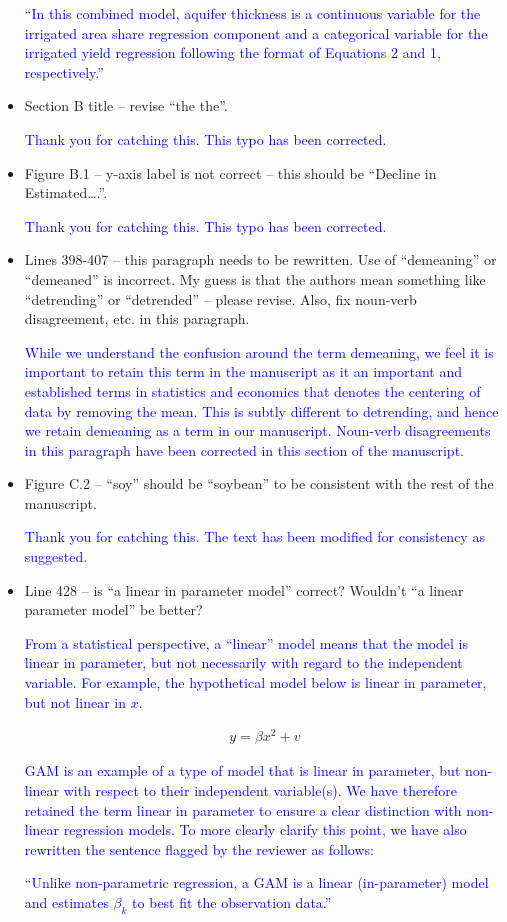 \documentclass[
]{article}
\begin{document}
\begin{itemize}
\textcolor{blue}{``In this combined model, aquifer thickness is a continuous variable for the irrigated area share regression component and a categorical variable for the irrigated yield regression following the format of Equations 2 and 1, respectively.''}

\item Section B title – revise ``the the''.

\textcolor{blue}{Thank you for catching this. This typo has been corrected.}

\item Figure B.1 – y-axis label is not correct – this should be ``Decline in Estimated….''.

\textcolor{blue}{Thank you for catching this. This typo has been corrected.}

\item Lines 398-407 – this paragraph needs to be rewritten. Use of ``demeaning'' or ``demeaned'' is incorrect. My guess is that the authors mean something like ``detrending'' or ``detrended'' – please revise. Also, fix noun-verb disagreement, etc. in this paragraph.

\textcolor{blue}{While we understand the confusion around the term demeaning, we feel it is important to retain this term in the manuscript as it an important and established terms in statistics and economics that denotes the centering of data by removing the mean. This is subtly different to detrending, and hence we retain demeaning as a term in our manuscript. Noun-verb disagreements in this paragraph have been corrected in this section of the manuscript.}

\item Figure C.2 – ``soy'' should be ``soybean'' to be consistent with the rest of the manuscript.

\textcolor{blue}{Thank you for catching this. The text has been modified for consistency as suggested.}

\item Line 428 – is ``a linear in parameter model'' correct? Wouldn't ``a linear parameter model'' be better?

\textcolor{blue}{From a statistical perspective, a ``linear'' model means that the model is linear in parameter, but not necessarily with regard to the independent variable. For example, the hypothetical model below is linear in parameter, but not linear in $x$.} 

\begin{align}
  y = \beta x^2 + v
\end{align}  

\textcolor{blue}{GAM is an example of a type of model that is linear in parameter, but non-linear with respect to their independent variable(s). We have therefore retained the term linear in parameter to ensure a clear distinction with non-linear regression models. To more clearly clarify this point, we have also rewritten the sentence flagged by the reviewer as follows:}

\textcolor{blue}{``Unlike non-parametric regression, a GAM is a linear (in-parameter) model and estimates $\beta_k$ to best fit the observation data.''}

\end{itemize}
\end{document}
